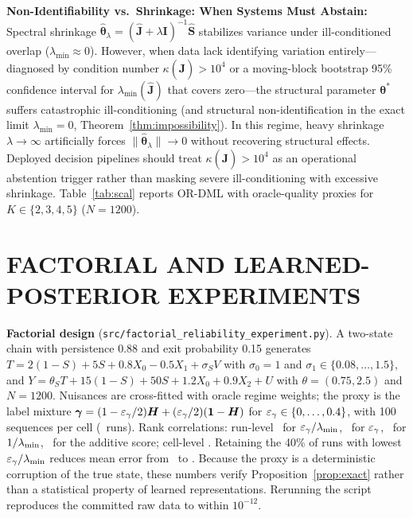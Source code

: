 \textbf{Non-Identifiability vs.\ Shrinkage: When Systems Must Abstain:}
Spectral shrinkage $\hat{\boldsymbol{\theta}}_\lambda = (\hat{\boldsymbol{J}} + \lambda \boldsymbol{I})^{-1}\hat{\boldsymbol{S}}$ stabilizes variance under ill-conditioned overlap ($\lambda_{\min} \approx 0$). However, when data lack identifying variation entirely---diagnosed by condition number $\kappa(\hat{\boldsymbol{J}}) > 10^4$ or a moving-block bootstrap 95\% confidence interval for $\lambda_{\min}(\hat{\boldsymbol{J}})$ that covers zero---the structural parameter $\boldsymbol{\theta}^*$ suffers catastrophic ill-conditioning (and structural non-identification in the exact limit $\lambda_{\min} = 0$, Theorem~\ref{thm:impossibility}). In this regime, heavy shrinkage $\lambda \to \infty$ artificially forces $\|\hat{\boldsymbol{\theta}}_\lambda\| \to 0$ without recovering structural effects. Deployed decision pipelines should treat $\kappa(\hat{\boldsymbol{J}}) > 10^4$ as an operational abstention trigger rather than masking severe ill-conditioning with excessive shrinkage.
Table~\ref{tab:scal} reports OR-DML with oracle-quality proxies for $K\in\{2,3,4,5\}$ ($N=1200$).
\begin{table}[h]\centering\footnotesize
\caption{Multi-regime scalability (\texttt{reports/multiregime\_scalability\_summary.csv}).}\label{tab:scal}

\end{table}

\section{FACTORIAL AND LEARNED-POSTERIOR EXPERIMENTS}
\label{app:factorial}
\textbf{Factorial design} (\texttt{src/factorial\_reliability\_experiment.py}). A two-state chain with persistence 0.88 and exit probability 0.15 generates $T=2(1{-}S)+5S+0.8X_0-0.5X_1+\sigma_SV$ with $\sigma_0=1$ and $\sigma_1\in\{0.08,\dots,1.5\}$, and $Y=\theta_ST+15(1{-}S)+50S+1.2X_0+0.9X_2+U$ with $\theta=(0.75,2.5)$ and $N=1200$. Nuisances are cross-fitted with oracle regime weights; the proxy is the label mixture $\boldsymbol{\gamma}=(1-\varepsilon_\gamma/2)\boldsymbol H+(\varepsilon_\gamma/2)(\boldsymbol 1-\boldsymbol H)$ for $\varepsilon_\gamma\in\{0,\dots,0.4\}$, with 100 sequences per cell (\FacNRuns\ runs). Rank correlations: run-level \FacRhoD\ for $\varepsilon_\gamma/\lambda_{\min}$, \FacRhoEps\ for $\varepsilon_\gamma$, \FacRhoLam\ for $1/\lambda_{\min}$, \FacRhoAdd\ for the additive score; cell-level \FacRhoDCell. Retaining the 40\% of runs with lowest $\varepsilon_\gamma/\lambda_{\min}$ reduces mean error from \FacFullErr\ to \FacRetainErr. Because the proxy is a deterministic corruption of the true state, these numbers verify Proposition~\ref{prop:exact} rather than a statistical property of learned representations. Rerunning the script reproduces the committed raw data to within $10^{-12}$.

